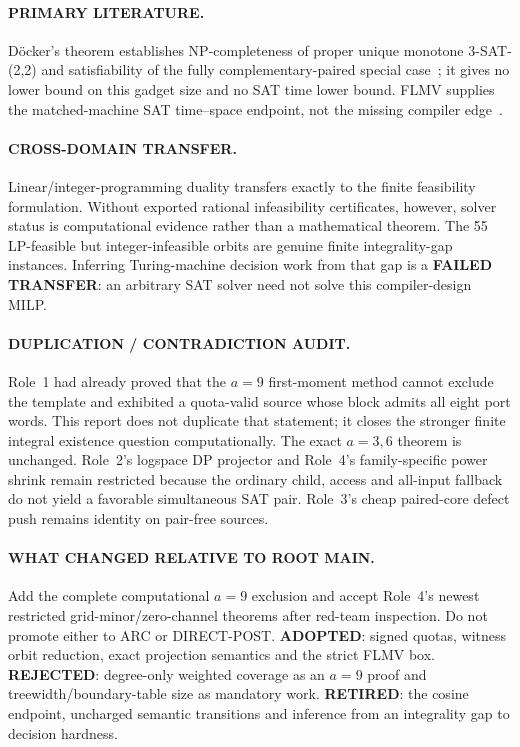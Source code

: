 \documentclass[11pt]{article}
\begin{document}
\paragraph{PRIMARY LITERATURE.}
D\"ocker's theorem establishes NP-completeness of proper unique monotone
3-SAT-(2,2) and satisfiability of the fully complementary-paired special
case~\cite{docker}; it gives no lower bound on this gadget size and no SAT
time lower bound.  FLMV supplies the matched-machine SAT time--space endpoint,
not the missing compiler edge~\cite{flmv}.

\paragraph{CROSS-DOMAIN TRANSFER.}
Linear/integer-programming duality transfers exactly to the finite feasibility
formulation.  Without exported rational infeasibility certificates, however,
solver status is computational evidence rather than a mathematical theorem.
The 55 LP-feasible but integer-infeasible orbits are genuine finite
integrality-gap instances.  Inferring Turing-machine decision work from that
gap is a \textbf{FAILED TRANSFER}: an arbitrary SAT solver need not solve this
compiler-design MILP.

\paragraph{DUPLICATION / CONTRADICTION AUDIT.}
Role~1 had already proved that the $a=9$ first-moment method cannot exclude
the template and exhibited a quota-valid source whose block admits all eight
port words.  This report does not duplicate that statement; it closes the
stronger finite integral existence question computationally.  The exact
$a=3,6$ theorem is unchanged.  Role~2's logspace DP projector and Role~4's
family-specific power shrink remain restricted because the ordinary child,
access and all-input fallback do not yield a favorable simultaneous SAT pair.
Role~3's cheap paired-core defect push remains identity on pair-free sources.

\paragraph{WHAT CHANGED RELATIVE TO ROOT MAIN.}
Add the complete computational $a=9$ exclusion and accept Role~4's newest
restricted grid-minor/zero-channel theorems after red-team inspection.  Do not
promote either to ARC or DIRECT-POST.  \textbf{ADOPTED}: signed quotas, witness
orbit reduction, exact projection semantics and the strict FLMV box.
\textbf{REJECTED}: degree-only weighted coverage as an $a=9$ proof and
treewidth/boundary-table size as mandatory work.  \textbf{RETIRED}: the
cosine endpoint, uncharged semantic transitions and inference from an
integrality gap to decision hardness.
\end{document}
